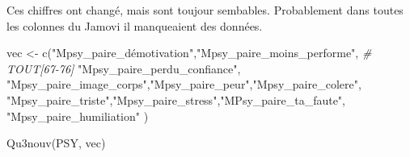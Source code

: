 \documentclass[
]{article}
\newenvironment{Shaded}{\begin{snugshade}}{\end{snugshade}}
\newcommand{\CommentTok}[1]{\textcolor[rgb]{0.56,0.35,0.01}{\textit{#1}}}
\newcommand{\FunctionTok}[1]{\textcolor[rgb]{0.00,0.00,0.00}{#1}}
\newcommand{\NormalTok}[1]{#1}
\newcommand{\OtherTok}[1]{\textcolor[rgb]{0.56,0.35,0.01}{#1}}
\newcommand{\StringTok}[1]{\textcolor[rgb]{0.31,0.60,0.02}{#1}}
\begin{document}
Ces chiffres ont changé, mais sont toujour sembables. Probablement dans
toutes les colonnes du Jamovi il manqueaient des données.

\begin{Shaded}
\begin{Highlighting}[]
\NormalTok{vec }\OtherTok{\textless{}{-}} \FunctionTok{c}\NormalTok{(}\StringTok{"Mpsy\_paire\_démotivation"}\NormalTok{,}\StringTok{"Mpsy\_paire\_moins\_performe"}\NormalTok{,  }\CommentTok{\# TOUT[67{-}76]}
         \StringTok{"Mpsy\_paire\_perdu\_confiance"}\NormalTok{,  }
    \StringTok{"Mpsy\_paire\_image\_corps"}\NormalTok{,}\StringTok{"Mpsy\_paire\_peur"}\NormalTok{,}\StringTok{"Mpsy\_paire\_colere"}\NormalTok{,}
    \StringTok{"Mpsy\_paire\_triste"}\NormalTok{,}\StringTok{"Mpsy\_paire\_stress"}\NormalTok{,}\StringTok{"MPsy\_paire\_ta\_faute"}\NormalTok{,}
    \StringTok{"Mpsy\_paire\_humiliation"}\NormalTok{ )}

\FunctionTok{Qu3nouv}\NormalTok{(PSY, vec)}
\end{Highlighting}
\end{Shaded}
\end{document}
